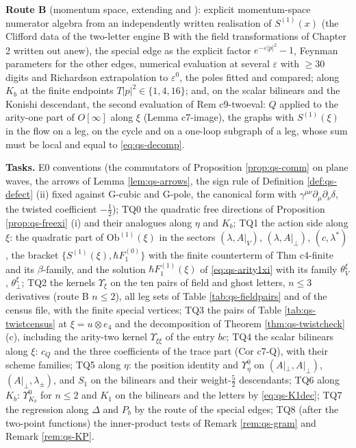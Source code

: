 \documentclass[11pt]{article}
\numberwithin{equation}{section}
\theoremstyle{plain}
\theoremstyle{definition}
\newcommand{\Ap}{A|_{\perp}}
\newcommand{\AV}{A|_V}
\begin{document}
\textbf{Route B} (momentum space, extending  and ): explicit momentum-space numerator algebra from an independently written realisation of $S^{(1)}(x)$ (the Clifford data of the two-letter engine B with the field transformations of Chapter 2 written out anew), the special edge as the explicit factor $e^{-\varepsilon|p|^2}-1$, Feynman parameters for the other edges, numerical evaluation at several $\varepsilon$ with $\ge30$ digits and Richardson extrapolation to $\varepsilon^0$, the poles fitted and compared; along $K_b$ at the finite endpoints $T|p|^2\in\{1,4,16\}$; and, on the scalar bilinears and the Konishi descendant, the second evaluation of Rem c9-twoeval: $Q$ applied to the arity-one part of $O[\infty]$ along $\xi$ (Lemma c7-image), the graphs with $S^{(1)}(\xi)$ in the flow on a leg, on the cycle and on a one-loop subgraph of a leg, whose sum must be local and equal to \eqref{eq:qs-decomp}.

\textbf{Tasks.} E0 conventions (the commutators of Proposition \ref{prop:qs-comm} on plane waves, the arrows of Lemma \ref{lem:qs-arrows}, the sign rule of Definition \ref{def:qs-defect} (ii) fixed against G-cubic and G-pole, the canonical form with $\gamma^{\mu\nu}\partial_\mu\partial_\nu\delta$, the twisted coefficient $-\tfrac12$); TQ0 the quadratic free directions of Proposition \ref{prop:qs-freexi} (i) and their analogues along $\eta$ and $K_b$; TQ1 the action side along $\xi$: the quadratic part of $\mathrm{Ob}^{(1)}(\xi)$ in the sectors $(\lambda,\AV)$, $(\lambda,\Ap)$, $(c,\lambda^*)$, the bracket $\{S^{(1)}(\xi),\hbar F_1^{(0)}\}$ with the finite counterterm of Thm c4-finite and its $\beta$-family, and the solution $\hbar F_1^{(1)}(\xi)$ of \eqref{eq:qs-arity1xi} with its family $\theta^\xi_V$, $\theta^\xi_\perp$; TQ2 the kernels $\Upsilon_\xi$ on the ten pairs of field and ghost letters, $n\le3$ derivatives (route B $n\le2$), all leg sets of Table \ref{tab:qs-fieldpairs} and of the census file, with the finite special vertices; TQ3 the pairs of Table \ref{tab:qs-twistcensus} at $\xi=u\otimes e_4$ and the decomposition of Theorem \ref{thm:qs-twistcheck} (c), including the arity-two kernel $\Upsilon_{\xi\xi}$ of the entry $bc$; TQ4 the scalar bilinears along $\xi$: $c_Q$ and the three coefficients of the trace part (Cor c7-Q), with their scheme families; TQ5 along $\eta$: the position identity and $\Upsilon^0_\eta$ on $(\Ap,\Ap)$, $(\Ap,\lambda_\pm)$, and $S_1$ on the bilinears and their weight-$\tfrac52$ descendants; TQ6 along $K_b$: $\Upsilon^0_{K_b}$ for $n\le2$ and $K_1$ on the bilinears and the letters by \eqref{eq:qs-K1dec}; TQ7 the regression along $\Delta$ and $P_b$ by the route of the special edges; TQ8 (after the two-point functions) the inner-product tests of Remark \ref{rem:qs-gram} and Remark \ref{rem:qs-KP}.
\end{document}
